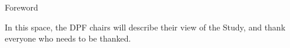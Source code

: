 


\begin{center}\begin{Large} Foreword   \end{Large}\end{center}

In this space, the DPF chairs will describe their view of the Study, and thank everyone who needs to be thanked.
